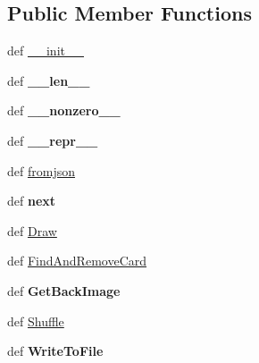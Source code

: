 \subsection*{Public Member Functions}
\begin{DoxyCompactItemize}
\item 
def \hyperlink{classcards-with-friends_1_1deck_1_1_deck_a4fe6b068257e432ad53061f38f7b41ad}{\-\_\-\-\_\-init\-\_\-\-\_\-}
\item 
\hypertarget{classcards-with-friends_1_1deck_1_1_deck_aba07c6e99b729b42a1b1e664272d4025}{def {\bfseries \-\_\-\-\_\-len\-\_\-\-\_\-}}\label{classcards-with-friends_1_1deck_1_1_deck_aba07c6e99b729b42a1b1e664272d4025}

\item 
\hypertarget{classcards-with-friends_1_1deck_1_1_deck_a05499246dcf44b6a0e6b868faa1b7d53}{def {\bfseries \-\_\-\-\_\-nonzero\-\_\-\-\_\-}}\label{classcards-with-friends_1_1deck_1_1_deck_a05499246dcf44b6a0e6b868faa1b7d53}

\item 
\hypertarget{classcards-with-friends_1_1deck_1_1_deck_a762d0eaa69201df45fa907d22caee2b5}{def {\bfseries \-\_\-\-\_\-repr\-\_\-\-\_\-}}\label{classcards-with-friends_1_1deck_1_1_deck_a762d0eaa69201df45fa907d22caee2b5}

\item 
def \hyperlink{classcards-with-friends_1_1deck_1_1_deck_a805f4390141a790fb0b8ac498e38b727}{fromjson}
\item 
\hypertarget{classcards-with-friends_1_1deck_1_1_deck_af5b795d0f0b9d9ec9e1bcdb718514b2f}{def {\bfseries next}}\label{classcards-with-friends_1_1deck_1_1_deck_af5b795d0f0b9d9ec9e1bcdb718514b2f}

\item 
def \hyperlink{classcards-with-friends_1_1deck_1_1_deck_a3831e8133c28c3ac53cc34285bdd4403}{Draw}
\item 
def \hyperlink{classcards-with-friends_1_1deck_1_1_deck_abbf374196d0f5f94c38dfbadeb9a8893}{Find\-And\-Remove\-Card}
\item 
\hypertarget{classcards-with-friends_1_1deck_1_1_deck_aa167404db0fe4cbe2ddf80a31c949c03}{def {\bfseries Get\-Back\-Image}}\label{classcards-with-friends_1_1deck_1_1_deck_aa167404db0fe4cbe2ddf80a31c949c03}

\item 
def \hyperlink{classcards-with-friends_1_1deck_1_1_deck_a0f17fe6567d06d5a653658f3b8c77571}{Shuffle}
\item 
\hypertarget{classcards-with-friends_1_1deck_1_1_deck_a5dd5e42df80bd51061868eecf47da588}{def {\bfseries Write\-To\-File}}\label{classcards-with-friends_1_1deck_1_1_deck_a5dd5e42df80bd51061868eecf47da588}


\end{DoxyCompactItemize}
